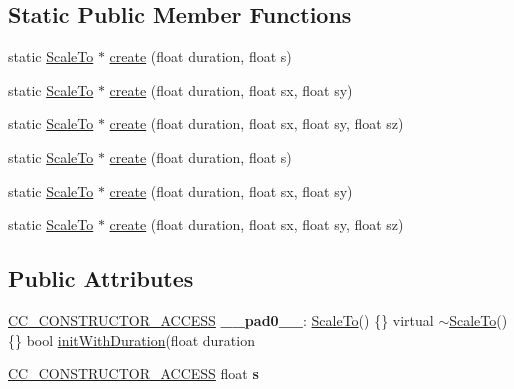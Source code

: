\subsection*{Static Public Member Functions}
\begin{DoxyCompactItemize}
\item 
static \hyperlink{classScaleTo}{Scale\+To} $\ast$ \hyperlink{classScaleTo_a6052ccf3f347dfabeb13db58de42e648}{create} (float duration, float s)
\item 
static \hyperlink{classScaleTo}{Scale\+To} $\ast$ \hyperlink{classScaleTo_addffb00ade532bd18d16af5ae81d6b5e}{create} (float duration, float sx, float sy)
\item 
static \hyperlink{classScaleTo}{Scale\+To} $\ast$ \hyperlink{classScaleTo_ae8aa9ca4ebfdf0ac1521c3a3d0e0a8c4}{create} (float duration, float sx, float sy, float sz)
\item 
static \hyperlink{classScaleTo}{Scale\+To} $\ast$ \hyperlink{classScaleTo_a029e3940cf28a28c8ff199fb62bab8d4}{create} (float duration, float s)
\item 
static \hyperlink{classScaleTo}{Scale\+To} $\ast$ \hyperlink{classScaleTo_a5a7bad8cf567a661e513b0417de5914e}{create} (float duration, float sx, float sy)
\item 
static \hyperlink{classScaleTo}{Scale\+To} $\ast$ \hyperlink{classScaleTo_ae24d6437ca8c4a6d880fbea2b40a05a3}{create} (float duration, float sx, float sy, float sz)
\end{DoxyCompactItemize}
\subsection*{Public Attributes}
\begin{DoxyCompactItemize}
\item 
\mbox{\label{classScaleTo_a944c659bb910ddf4a1bff9a6ac822fc9}} 
\hyperlink{_2cocos2d_2cocos_2base_2ccConfig_8h_a25ef1314f97c35a2ed3d029b0ead6da0}{C\+C\+\_\+\+C\+O\+N\+S\+T\+R\+U\+C\+T\+O\+R\+\_\+\+A\+C\+C\+E\+SS} {\bfseries \+\_\+\+\_\+pad0\+\_\+\+\_\+}\+: \hyperlink{classScaleTo}{Scale\+To}() \{\} virtual $\sim$\hyperlink{classScaleTo}{Scale\+To}() \{\} bool \hyperlink{classScaleTo_ab9b91e0f4ecfc3fad18cb4f929bd5e18}{init\+With\+Duration}(float duration
\item 
\mbox{\label{classScaleTo_a1b0378c3183085e620cdf7aea696dabf}} 
\hyperlink{_2cocos2d_2cocos_2base_2ccConfig_8h_a25ef1314f97c35a2ed3d029b0ead6da0}{C\+C\+\_\+\+C\+O\+N\+S\+T\+R\+U\+C\+T\+O\+R\+\_\+\+A\+C\+C\+E\+SS} float {\bfseries s}
\end{DoxyCompactItemize}
